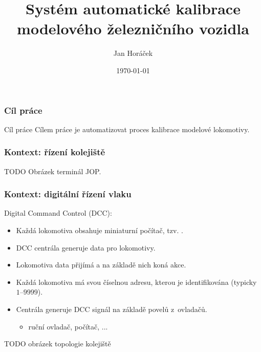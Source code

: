 \documentclass[aspectratio=169]{beamer}
\title[Automatická kalibrace]{Systém automatické kalibrace modelového
železničního vozidla}
\author{Jan Horáček}
\institute[FI MUNI]{
	Fakulta informatiky \\
	Masarykova univerzita \\
	\medskip
	\textit{horacekj@mail.muni.cz}
}
\date{\today}
\begin{document}

\begin{frame}
\titlepage
\end{frame}


\begin{frame}
\frametitle{Cíl práce}
\begin{block}{Cíl práce}
Cílem práce je automatizovat proces kalibrace modelové lokomotivy.
\end{block}
\end{frame}


\begin{frame}
\frametitle{Kontext: řízení kolejiště}
TODO Obrázek terminál JOP.
\end{frame}


\begin{frame}
\frametitle{Kontext: digitální řízení vlaku}
Digital Command Control (DCC):
\begin{itemize}
\item Každá lokomotiva obsahuje miniaturní počítač, tzv. .
\item DCC centrála generuje data pro lokomotivy.
\item Lokomotiva data přijímá a na základě nich koná akce.
\item Každá lokomotiva má svou číselnou adresu, kterou je identifikována (typicky
$1$--$9999$).
\item Centrála generuje DCC signál na základě povelů z~ovladačů.
\begin{itemize}
\item ruční ovladač, počítač, ...
\end{itemize}
\end{itemize}

TODO obrázek topologie kolejiště
\end{frame}

\end{document}
